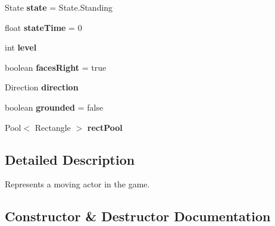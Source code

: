 \begin{DoxyCompactItemize}
\item 
\mbox{\label{classnl_1_1arjanfrans_1_1mario_1_1model_1_1MovingActor_a21abe2ecfca8b85ae022eee104a8ab22}} 
State {\bfseries state} = State.\+Standing
\item 
\mbox{\label{classnl_1_1arjanfrans_1_1mario_1_1model_1_1MovingActor_a33055aba77dd7e121bcf69a2f320a531}} 
float {\bfseries state\+Time} = 0
\item 
\mbox{\label{classnl_1_1arjanfrans_1_1mario_1_1model_1_1MovingActor_afad448059900c30a0ad2ec4cfe59c097}} 
int {\bfseries level}
\item 
\mbox{\label{classnl_1_1arjanfrans_1_1mario_1_1model_1_1MovingActor_a44a86824a451864ebb36565ddde0baaa}} 
boolean {\bfseries faces\+Right} = true
\item 
\mbox{\label{classnl_1_1arjanfrans_1_1mario_1_1model_1_1MovingActor_a274b212ed9a2c36f600ebb3a747582a4}} 
Direction {\bfseries direction}
\item 
\mbox{\label{classnl_1_1arjanfrans_1_1mario_1_1model_1_1MovingActor_a152afcb89273fa62925ea2a6c1c10515}} 
boolean {\bfseries grounded} = false
\item 
Pool$<$ Rectangle $>$ {\bfseries rect\+Pool}
\end{DoxyCompactItemize}


\subsection{Detailed Description}
Represents a moving actor in the game. 

\subsection{Constructor \& Destructor Documentation}
\mbox{\label{classnl_1_1arjanfrans_1_1mario_1_1model_1_1MovingActor_a56800b4b8e8457bb2e0f1a4ad38b6576}} 
